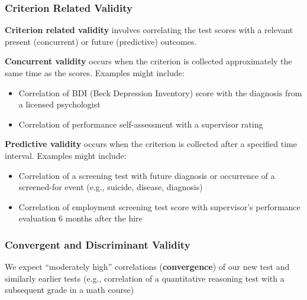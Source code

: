 \documentclass[
  english,
]{book}
\providecommand{\tightlist}{%
  \setlength{\itemsep}{0pt}\setlength{\parskip}{0pt}}
\begin{document}
\hypertarget{criterion-related-validity}{%
\subsubsection{Criterion Related Validity}\label{criterion-related-validity}}

\textbf{Criterion related validity} involves correlating the test scores with a relevant present (concurrent) or future (predictive) outcomes.

\textbf{Concurrent validity} occurs when the criterion is collected approximately the same time as the scores. Examples might include:

\begin{itemize}
\tightlist
\item
  Correlation of BDI (Beck Depression Inventory) score with the diagnosis from a licensed psychologist
\item
  Correlation of performance self-assessment with a supervisor rating
\end{itemize}

\textbf{Predictive validity} occurs when the criterion is collected after a specified time interval. Examples might include:

\begin{itemize}
\tightlist
\item
  Correlation of a screening test with future diagnosis or occurrence of a screened-for event (e.g., suicide, disease, diagnosis)
\item
  Correlation of employment screening test score with supervisor's performance evaluation 6 months after the hire
\end{itemize}

\hypertarget{convergent-and-discriminant-validity}{%
\subsubsection{Convergent and Discriminant Validity}\label{convergent-and-discriminant-validity}}

We expect ``moderately high'' correlations (\textbf{convergence}) of our new test and similarly earlier tests (e.g., correlation of a quantitative reasoning test with a subsequent grade in a math course)
\end{document}
